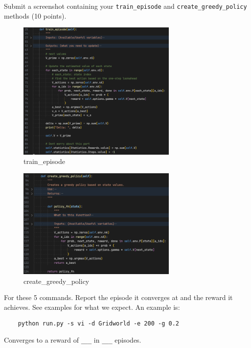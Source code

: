 \documentclass[a4paper]{article}
\theoremstyle{definition}
\newenvironment{soln}{
    \leavevmode\color{blue}\ignorespaces
}{}
\begin{document}
Submit a screenshot containing your \verb|train_episode| and \verb|create_greedy_policy| methods (10 points).

\begin{soln}
	\begin{figure}[H]
		\centering
		\includegraphics[width=0.7\textwidth]{img/vi_train_episode.png}
		\caption*{train\_episode}
	\end{figure}
	\begin{figure}[H]
		\centering
		\includegraphics[width=0.7\textwidth]{img/vi_create_greedy_policy.png}
		\caption*{create\_greedy\_policy}
	\end{figure}
\end{soln}


\vspace{5mm}
For these 5 commands. Report the episode it converges at and the reward it achieves. See examples for what we expect. An example is: \begin{verbatim}
    python run.py -s vi -d Gridworld -e 200 -g 0.2
\end{verbatim}
Converges to a reward of \verb|___| in \verb|___| episodes.
\end{document}
